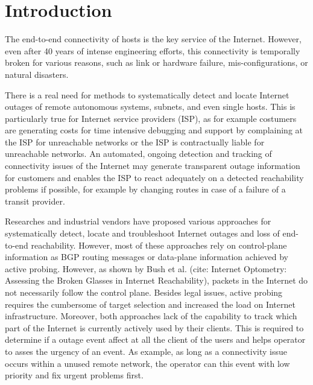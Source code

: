 
\chapter{Introduction}

The end-to-end connectivity of hosts is the key service of the Internet. However, even after 40 years of intense engineering efforts, this connectivity is temporally broken for various reasons, such as link or hardware failure\citep{}, mis-configurations\citep{}, or natural disasters\citep{}. 

There is a real need for methods to systematically detect and locate Internet outages of remote autonomous systems, subnets, and even single hosts. This is particularly true for Internet service providers (ISP), as for example costumers are generating costs for time intensive debugging and support by complaining at the ISP for unreachable networks or the ISP is contractually liable for unreachable networks. An automated, ongoing detection and tracking of connectivity issues of the Internet may generate transparent outage information for customers and enables the ISP to react adequately on a detected reachability problems if possible, for example by changing routes in case of a failure of a transit provider. 

Researches and industrial vendors have proposed various approaches for systematically detect, locate and troubleshoot Internet outages and loss of end-to-end reachability.
However, most of these approaches rely on control-plane information as BGP routing messages or data-plane information achieved by active probing. 
However, as shown by Bush et al. (cite: Internet Optometry: Assessing the Broken Glasses in Internet Reachability), packets in the Internet do not necessarily follow the control plane. Besides legal issues, active probing requires the cumbersome of target selection and increased the load on Internet infrastructure. Moreover, both approaches lack of the capability to track which part of the Internet is currently actively used by their clients. This is required to determine if a outage event affect at all the client of the users and helps operator to asses the urgency of an event. As example, as long as a connectivity issue occurs within a unused remote network, the operator can this event with low priority and fix urgent problems first.

